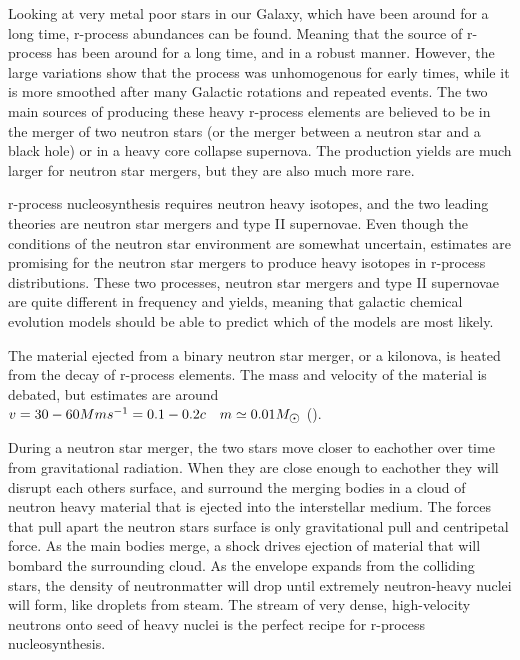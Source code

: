 Looking at very metal poor stars in our Galaxy, which have been around for a long time, r-process abundances can be found. Meaning that the source of r-process has been around for a long time, and in a robust manner. However, the large variations show that the process was unhomogenous for early times, while it is more smoothed after many Galactic rotations and repeated events.
The two main sources of producing these heavy r-process elements are believed to be in the merger of two neutron stars (or the merger between a neutron star and a black hole) or in a heavy core collapse supernova. The production yields are much larger for neutron star mergers, but they are also much more rare.

r-process nucleosynthesis requires neutron heavy isotopes, and the two leading theories are neutron star mergers and type II supernovae. Even though the conditions of the neutron star environment are somewhat uncertain, estimates are promising for the neutron star mergers to produce heavy isotopes in r-process distributions.
These two processes, neutron star mergers and type II supernovae are quite different in frequency and yields, meaning that galactic chemical evolution models should be able to predict which of the models are most likely.

The material ejected from a binary neutron star merger, or a kilonova, is heated from the decay of r-process elements.
The mass and velocity of the material is debated,
but estimates are around $v=30-60 Mms^{-1} = 0.1-0.2c \quad m \simeq 0.01 \msol$ ().

During a neutron star merger, the two stars move closer to eachother over time from gravitational radiation. When they are close enough to eachother they will disrupt each others surface, and surround the merging bodies in a cloud of neutron heavy material that is ejected into the interstellar medium.
The forces that pull apart the neutron stars surface is only gravitational pull and centripetal force.
As the main bodies merge, a shock drives ejection of material that will bombard the surrounding cloud.
As the envelope expands from the colliding stars, the density of neutronmatter will drop until extremely neutron-heavy nuclei will form, like droplets from steam.
The stream of very dense, high-velocity neutrons onto seed of heavy nuclei is the perfect recipe for r-process nucleosynthesis.

